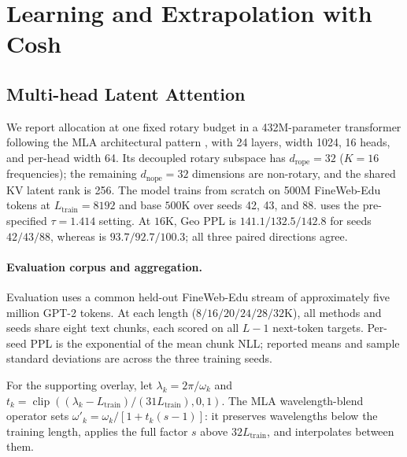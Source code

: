 \section{Learning and Extrapolation with Cosh}
\label{sec:compact-learning}
\subsection{Multi-head Latent Attention}
\label{sec:mla-results}

We report allocation at one fixed rotary budget in a 432M-parameter transformer following
the MLA architectural pattern \citep{deepseekv2}, with 24 layers, width 1024,
16 heads, and per-head width 64.
Its decoupled rotary
subspace has $d_{\mathrm{rope}}{=}32$ ($K{=}16$ frequencies); the remaining
$d_{\mathrm{nope}}{=}32$ dimensions are non-rotary, and the shared KV latent
rank is 256. The model trains from scratch on 500M FineWeb-Edu tokens
\citep{penedo2024fineweb} at
$L_{\mathrm{train}}{=}8192$ and base $500\mathrm{K}$ over seeds 42, 43, and
88. \evq{} uses the pre-specified $\tau=1.414$ setting.
At $16$K, Geo PPL is
$141.1/132.5/142.8$ for seeds $42/43/88$, whereas \evq{} is
$93.7/92.7/100.3$; all three paired directions agree.

\paragraph{Evaluation corpus and aggregation.}
Evaluation uses a common held-out FineWeb-Edu stream of approximately five
million GPT-2 tokens. At each length ($8/16/20/24/28/32$K), all methods
and seeds share eight text chunks, each scored on all $L-1$ next-token targets.
Per-seed PPL is the exponential of the mean chunk NLL; reported means and
sample standard deviations are across the three training seeds.

For the supporting overlay, let $\lambda_k=2\pi/\omega_k$ and
$t_k=\operatorname{clip}((\lambda_k-L_{\mathrm{train}})/(31L_{\mathrm{train}}),0,1)$.
The MLA wavelength-blend operator sets
$\omega'_k=\omega_k/[1+t_k(s-1)]$: it preserves wavelengths below the training
length, applies the full factor $s$ above $32L_{\mathrm{train}}$, and interpolates
between them.

